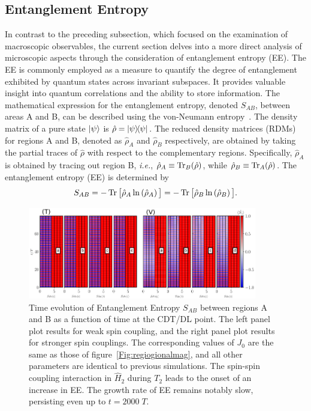 \documentclass[12pt]{iopart}
\begin{document}
	\subsection{\label{sec:level41} Entanglement Entropy}
In contrast to the preceding subsection, which focused on the examination of macroscopic observables, the current section delves into a more direct analysis of microscopic aspects through the consideration of entanglement entropy (EE). The EE is commonly employed as a measure to quantify the degree of entanglement exhibited by quantum states across invariant subspaces. It provides valuable insight into quantum correlations and the ability to store information. The mathematical expression for the entanglement entropy, denoted $S_{AB}$, between areas A and B, can be described using the von-Neumann entropy~\cite{bayat_entanglement_2022,mendes-santos_measuring_2020}.   The density matrix of a pure state $\ket{\psi}$ is $\hat{\rho}= \ketbra{\psi}$. The reduced density matrices (RDMs) for regions A and B, denoted as $\hat{\rho}_A$ and $\hat{\rho}_B$ respectively, are obtained by taking the partial traces of $\hat{\rho}$ with respect to the complementary regions. Specifically, $\hat{\rho}_A$ is obtained by tracing out region B, \textit{i.e.}, $\hat{\rho}_A\equiv \mathop{\mathrm{Tr}}\nolimits_B(\hat{\rho})$, while $\hat{\rho}_B\equiv\mathop{\mathrm{Tr}}\nolimits_A(\hat{\rho})$. The entanglement entropy (EE) is determined by
\begin{equation} 
    S_{AB} = -\mathop{\mathrm{Tr}}\nolimits\big[\hat{\rho}_A \ln\left(\hat{\rho}_A\right)\big] = -\mathop{\mathrm{Tr}}\nolimits\big[\hat{\rho}_B \ln\left(\hat{\rho}_B\right)\big].
    \label{eq:vonentrop}
\end{equation}	
\begin{figure}[t!]
    \begin{center}
        \includegraphics[width=10cm]{figure10.pdf}
    \end{center}
    \caption{Time evolution of Entanglement Entropy $S_{AB}$ between regions A and B as a function of time at the CDT/DL point. The left panel plot results for weak spin coupling, and the right panel plot results for stronger spin couplings. The corresponding values of $J_0$ are the same as those of figure~\ref{Fig:regiogionalmag}, and all other parameters are identical to previous simulations. The spin-spin coupling interaction in $\hat{H}_2$ during $T_2$ leads to the onset of an increase in EE. The growth rate of EE remains notably slow, persisting even up to $t=2000\;T$.}
    \label{Fig:entangle}
\end{figure}
\end{document}
